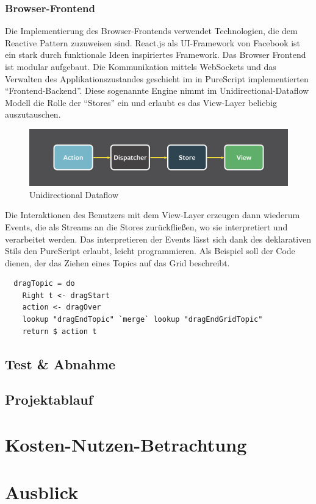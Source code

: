 \documentclass[12pt,a4paper]{scrartcl}
\begin{document}
\subsubsection{Browser-Frontend}
Die Implementierung des Browser-Frontends verwendet Technologien, die dem Reactive Pattern zuzuweisen sind.
React.js als UI-Framework von Facebook ist ein stark durch funktionale Ideen inspiriertes Framework. Das Browser Frontend ist modular aufgebaut. Die Kommunikation mittels WebSockets und das Verwalten des Applikationszustandes geschieht im in PureScript implementierten ``Frontend-Backend''. Diese sogenannte Engine nimmt im Unidirectional-Dataflow Modell die Rolle der ``Stores'' ein und erlaubt es das View-Layer beliebig auszutauschen.
\begin{figure}[h]
\includegraphics[scale=0.3]{img/Unidirectional.png}
\caption{Unidirectional Dataflow}
\end{figure}

Die Interaktionen des Benutzers mit dem View-Layer erzeugen dann wiederum Events, die als Streams an die Stores zurückfließen, wo sie interpretiert und verarbeitet werden. Das interpretieren der Events lässt sich dank des deklarativen Stils den PureScript erlaubt, leicht programmieren. Als Beispiel soll der Code dienen, der das Ziehen eines Topics auf das Grid beschreibt.


\begin{lstlisting}
  dragTopic = do
    Right t <- dragStart
    action <- dragOver
    lookup "dragEndTopic" `merge` lookup "dragEndGridTopic"
    return $ action t
\end{lstlisting}

\subsection{Test \& Abnahme}
\subsection{Projektablauf}
\section{Kosten-Nutzen-Betrachtung}
\section{Ausblick}
\end{document}
